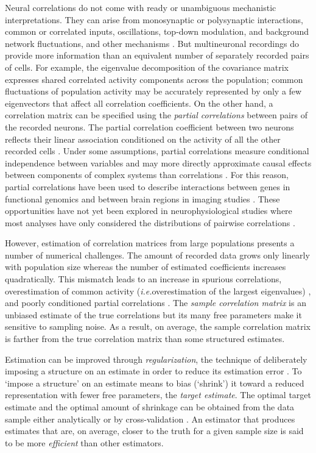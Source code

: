 Neural correlations do not come with ready or unambiguous mechanistic interpretations. They can arise from monosynaptic or polysynaptic interactions, common or correlated inputs, oscillations, top-down modulation, and background network fluctuations, and other mechanisms \citep{Perkel:1967, Moore:1970, Shadlen:1998, Salinas:2001, Ostojic:2009, Rosenbaum:2011}. But multineuronal recordings do provide more information than an equivalent number of separately recorded pairs of cells. For example, the eigenvalue decomposition of the covariance matrix expresses shared correlated activity components across the population; common fluctuations of population activity may be accurately represented by only a few eigenvectors that affect all correlation coefficients. On the other hand, a correlation matrix can be specified using the \emph{partial correlations} between pairs of the recorded neurons. The partial correlation coefficient between two neurons reflects their linear association conditioned on the activity of all the other recorded cells \citep{Whittaker:1990}.  Under some assumptions, partial correlations measure conditional independence between variables and may more directly approximate causal effects between components of complex systems than correlations \citep{Whittaker:1990}. For this reason, partial correlations have been used to describe interactions between genes in functional genomics \citep{Schafer:2005, Peng:2009} and between brain regions in imaging studies \citep{Varoquaux:2012, Ryali:2012}. These opportunities have not yet been explored in neurophysiological studies where most analyses have only considered the distributions of pairwise correlations \citep{Zohary:1994, Bair:2001, Smith:2008, Ecker:2010}.

However, estimation of correlation matrices from large populations presents a number of numerical challenges. The amount of recorded data grows only linearly with population size whereas the number of estimated coefficients increases quadratically. This mismatch leads to an increase in spurious correlations, overestimation of common activity (\emph{i.e.}\;overestimation of the largest eigenvalues) \citep{Ledoit:2004}, and poorly conditioned partial correlations \citep{Schafer:2005}. The \emph{sample correlation matrix} is an unbiased estimate of the true correlations but its many free parameters make it sensitive to sampling noise. As a result, on average, the sample correlation matrix is farther from the true correlation matrix than some structured estimates.

Estimation can be improved through \emph{regularization},  the technique of deliberately imposing a structure on an estimate in order to reduce its estimation error \citep{Schafer:2005, Bickel:2006}. To `impose a structure' on an estimate means to bias (`shrink') it toward a reduced representation  with fewer free parameters, the \emph{target estimate}.   The optimal target estimate and the optimal amount of shrinkage can be obtained from the data sample either analytically \citep{Ledoit:2003, Ledoit:2004, Schafer:2005}  or by cross-validation \citep{Friedman:1989}. An estimator that produces estimates that are, on average, closer to the truth for a given sample size is said to be more \emph{efficient} than other estimators.

